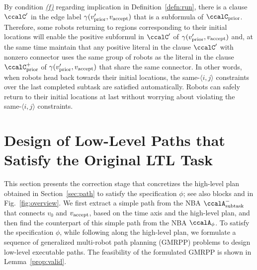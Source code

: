 \documentclass[Afour,sageh,times]{sagej}
\newcommand*\circled[1]{\tikz[baseline=(char.base)]{
            \node[shape=circle,draw,inner sep=1pt] (char) {#1};}}
\newcommand{\auto}[1]{\ccalA_{\textup{#1}}}
\newcommand{\autop}{\ccalA_{\phi}}
\newcommand{\vertex}[1]{v_{\textup{#1}}}
\newcommand{\ag}[2]{\langle#1,#2\rangle}
\newcommand{\node}[1]{V_{n}^{\text{#1}}}
\begin{document}
{{{By condition \hyperref[cond:f]{\it (f)} regarding implication in Definition~\ref{defn:run}, there is a clause  $\ccalC'$ in the edge label $\gamma(\vertex{prior}', \vertex{accept})$ that is a subformula of $\ccalC_{\text{prior}}$. Therefore, some robots returning to regions corresponding to their initial locations  will enable the positive subformul in $\ccalC'$ of $\gamma(\vertex{prior}', \vertex{accept})$ and, at the same time maintain that any positive literal in the clause $\ccalC'$ with nonzero connector uses the same group of robots as the literal in the clause $\ccalC_{\text{prior}}^+$ of $\gamma(\vertex{prior}', \vertex{accept})$ that share  the same connector.  In other words, when robots head back towards their initial locations, the same-$\ag{i}{j}$ constraints over the last completed subtask are satisfied automatically. Robots can safely return to their initial locations at last without worrying about violating the same-$\ag{i}{j}$ constraints.


  \section{Design of Low-Level Paths that Satisfy the Original LTL Task}\label{sec:solution2mrta}
  This section presents the correction stage  that concretizes the high-level plan obtained in Section~\ref{sec:path} to satisfy the specification $\phi$; see also blocks \circled{6} and \circled{7} in Fig.~\ref{fig:overview}.
  We first extract a simple path from the NBA $\auto{subtask}^-$ that connects $v_0$ and $\vertex{accept}$, based on the time axis and the high-level plan, and then find the counterpart of this simple path from the NBA $\autop$. To satisfy the specification $\phi$, while following along the high-level plan, we formulate a sequence of generalized multi-robot path planning (GMRPP) problems  to design low-level executable paths. The feasibility of the formulated GMRPP is shown in Lemma~\ref{prop:valid}.

}}}
\end{document}
